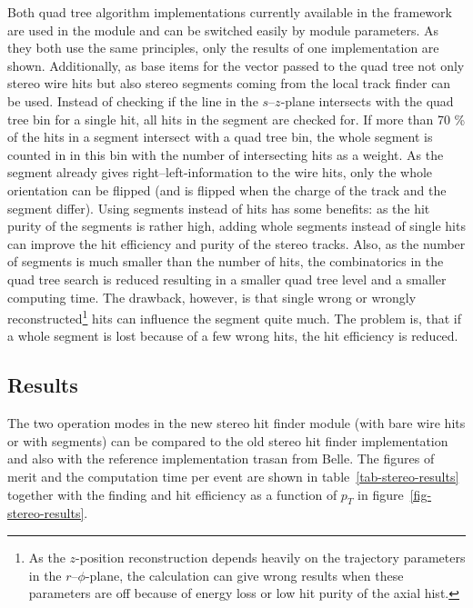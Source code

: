 Both quad tree algorithm implementations currently available in the framework are used in the module and can be switched easily by module parameters. As they both use the same principles, only the results of one implementation are shown. Additionally, as base items for the vector passed to the quad tree not only stereo wire hits but also stereo segments coming from the local track finder can be used. Instead of checking if the line in the $s$--$z$-plane intersects with the quad tree bin for a single hit, all hits in the segment are checked for. If more than 70 \% of the hits in a segment intersect with a quad tree bin, the whole segment is counted in in this bin with the number of intersecting hits as a weight. As the segment already gives right--left-information to the wire hits, only the whole orientation can be flipped (and is flipped when the charge of the track and the segment differ). Using segments instead of hits has some benefits: as the hit purity of the segments is rather high, adding whole segments instead of single hits can improve the hit efficiency and purity of the stereo tracks. Also, as the number of segments is much smaller than the number of hits, the combinatorics in the quad tree search is reduced resulting in a smaller quad tree level and a smaller computing time. The drawback, however, is that single wrong or wrongly reconstructed\footnote{As the $z$-position reconstruction depends heavily on the trajectory parameters in the $r$--$\phi$-plane, the calculation can give wrong results when these parameters are off because of energy loss or low hit purity of the axial hist.} hits can influence the segment quite much. The problem is, that if a whole segment is lost because of a few wrong hits, the hit efficiency is reduced.

\subsection{Results}

The two operation modes in the new stereo hit finder module (with bare wire hits or with segments) can be compared to the old stereo hit finder implementation and also with the reference implementation trasan from Belle. The figures of merit and the computation time per event are shown in table~\ref{tab-stereo-results} together with the finding and hit efficiency as a function of $p_T$ in figure~\ref{fig-stereo-results}. 

